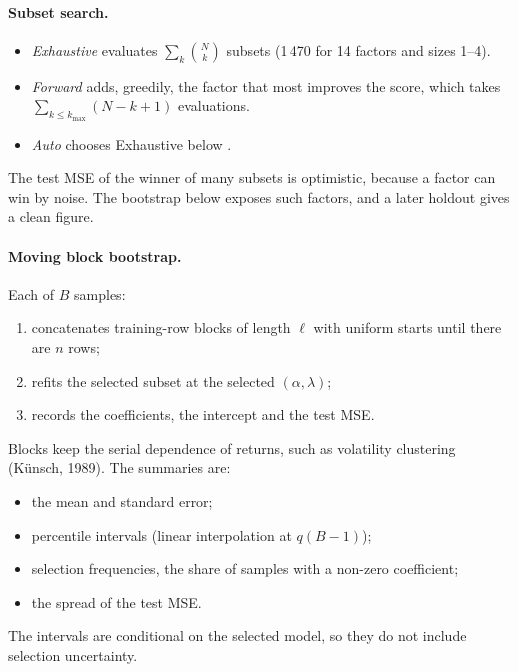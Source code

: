 \documentclass[11pt,a4paper]{article}
\begin{document}
\paragraph{Subset search.}
\begin{itemize}
  \item \emph{Exhaustive} evaluates $\sum_k\binom Nk$ subsets (1\,470 for 14 factors and
        sizes 1--4).
  \item \emph{Forward} adds, greedily, the factor that most improves the score, which takes
        $\sum_{k\le k_{\max}}(N-k+1)$ evaluations.
  \item \emph{Auto} chooses Exhaustive below .
\end{itemize}
The test MSE of the winner of many subsets is optimistic, because a factor can win by noise.
The bootstrap below exposes such factors, and a later holdout gives a clean figure.

\paragraph{Moving block bootstrap.} Each of $B$ samples:
\begin{enumerate}
  \item concatenates training-row blocks of length $\ell$ with uniform starts until there
        are $n$ rows;
  \item refits the selected subset at the selected $(\alpha,\lambda)$;
  \item records the coefficients, the intercept and the test MSE.
\end{enumerate}
Blocks keep the serial dependence of returns, such as volatility clustering (K\"unsch, 1989).
The summaries are:
\begin{itemize}
  \item the mean and standard error;
  \item percentile intervals (linear interpolation at $q(B-1)$);
  \item selection frequencies, the share of samples with a non-zero coefficient;
  \item the spread of the test MSE.
\end{itemize}
The intervals are conditional on the selected model, so they do not include selection
uncertainty.
\end{document}
